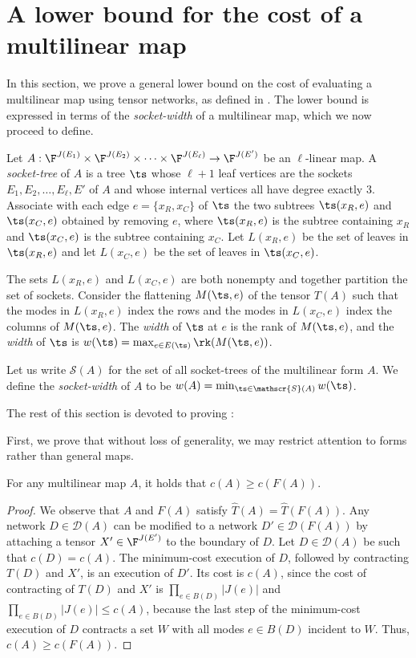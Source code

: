 \section{A lower bound for the cost of a multilinear map}
\label{sec:general lower bound}

In this section, we prove a general lower bound on the cost of
evaluating a multilinear map using tensor networks, as defined in
.  The lower bound is expressed in terms of the \emph{socket-width} of a multilinear map, which we
now proceed to define.

Let $A:\F^{J(E_1)}\times\F^{J(E_2)}\times\cdots \times\F^{J(E_\ell)}
\rightarrow \F^{J(E')}$ be an $\ell$-linear map.  A \emph{socket-tree}
of $A$ is a tree $\ts$ whose $\ell+1$ leaf vertices are the sockets
$E_1,E_2,\ldots,E_\ell, E'$ of $A$ and whose internal vertices all have
degree exactly $3$.  Associate with each edge $e = \{x_R, x_C\}$ of $\ts$
the two subtrees $\ts(x_R, e)$ and $\ts(x_C, e)$ obtained by
removing $e$, where $\ts(x_R, e)$ is the subtree containing $x_R$ and $\ts(x_C,
e)$ is the subtree containing $x_C$.  Let $L(x_R, e)$
be the set of leaves in $\ts(x_R, e)$ and let $L(x_C, e)$
be the set of leaves in $\ts(x_C, e)$.

The sets $L(x_R, e)$ and $L(x_C,e)$ are both nonempty and together
partition the set of sockets.  Consider the flattening $M(\ts,e)$ of the tensor $T(A)$ such that the modes in
$L(x_R,e)$ index the rows and the modes in  $L(x_C,e)$ index
the columns of $M(\ts,e)$.  The \emph{width} of $\ts$ at $e$ is the
rank of $M(\ts, e)$, and the \emph{width} of $\ts$ is
$w(\ts)=\max_{e\in E(\ts)} \rk(M(\ts,e))$.

Let us write $\mathscr{S}(A)$ for the set of all socket-trees of the
multilinear form $A$.  We define the \emph{socket-width} of $A$ to be
$w(A)=\min_{\ts\in\mathscr{S}(A)} w(\ts)$.

The rest of this section is devoted to proving :

\GeneralLowerBoundTheorem*

First, we prove that without loss of generality, we may restrict
attention to forms rather than general maps.

\begin{claim}
For any multilinear map $A$, it holds that $c(A) \ge c(F(A))$.
\end{claim}
\begin{proof}
We observe that $A$ and $F(A)$ satisfy $\hat{T}(A)=\hat{T}(F(A))$. Any network
$D\in \mathscr{D}(A)$ can be modified to a network
$D'\in \mathscr{D}(F(A))$ by attaching a tensor $X' \in \F^{J(E')}$ to the boundary
of $D$. Let $D\in \mathscr{D}(A)$ be such that
$c(D)=c(A)$. The minimum-cost execution of $D$, followed
by contracting $T(D)$ and $X'$, is an execution of $D'$. Its
cost is $c(A)$, since the cost of contracting of $T(D)$ and $X'$ is $\prod_{e \in B(D)} |J(e)|$ and $\prod_{e \in B(D)} |J(e)| \leq c(A)$, because the last step of the minimum-cost execution of $D$ contracts a set $W$ with all modes $e \in B(D)$ incident to $W$. Thus, $c(A)\ge c(F(A))$.
\end{proof}

